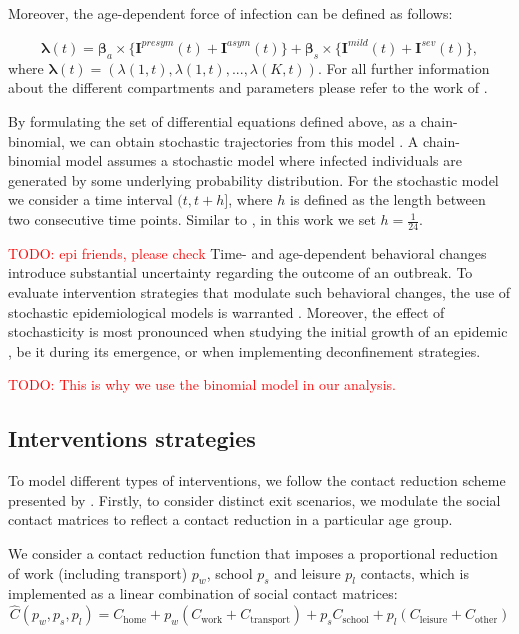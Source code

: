\documentclass{article}
\renewcommand{\cite}[1]{\citep{#1}}
\newcommand\todo[1]{\textcolor{red}{TODO: #1}}
\newcommand{\chome}{C_{\text{home}}}
\newcommand{\cwork}{C_{\text{work}}}
\newcommand{\ctransport}{C_{\text{transport}}}
\newcommand{\cschool}{C_{\text{school}}}
\newcommand{\cleisure}{C_{\text{leisure}}}
\newcommand{\cother}{C_{\text{other}}}
\newcommand{\agegroups}{K}
\begin{document}
Moreover, the age-dependent force of infection can be defined as follows:

\begin{equation}
    \boldsymbol{\lambda}(t) = \boldsymbol{\beta}_{a} \times \{ \textbf{I}^{presym}(t) + \textbf{I}^{asym}(t) \} +
    \boldsymbol{\beta}_{s} \times \{ \textbf{I}^{mild}(t) + \textbf{I}^{sev}(t) \},
\end{equation}
%
where $\boldsymbol{\lambda}(t) = (\lambda(1, t), \lambda(1, t), ..., \lambda(\agegroups, t))$. For all further information about the different compartments and parameters please refer to the work of \citet{abrams2021modelling}.

By formulating the set of differential equations defined above, as a chain-binomial, we can obtain stochastic trajectories from this model \cite{bailey1975mathematical}. A chain-binomial model assumes a stochastic model where infected individuals are generated by some underlying probability distribution. For the stochastic model we consider a time interval $(t, t +h]$, where $h$ is defined as the length between two consecutive time points. Similar to \citet{abrams2021modelling}, in this work we set $h = \frac{1}{24}$.

\todo{epi friends, please check} Time- and age-dependent behavioral changes introduce substantial uncertainty regarding the outcome of an outbreak. To evaluate intervention strategies that modulate such behavioral changes, the use of stochastic epidemiological models is warranted \cite{abrams2021modelling}. Moreover, the effect of stochasticity is most pronounced when studying the initial growth of an epidemic \cite{britton2009epidemic}, be it during its emergence, or when implementing deconfinement strategies.

\todo{This is why we use the binomial model in our analysis.}

\subsection{Interventions strategies}
\label{sec:interventions}
To model different types of interventions, we follow the contact reduction scheme presented by \citet{abrams2021modelling}. Firstly, to consider distinct exit scenarios, we modulate the social contact matrices to reflect a contact reduction in a particular age group.

We consider a contact reduction function that imposes a proportional reduction of work (including transport) $p_w$, school $p_s$ and leisure $p_l$ contacts, which is implemented as a linear combination of social contact matrices:
\begin{equation}
\label{eq:scm}
    \hat{C}(p_w, p_s, p_l) = \chome + p_w (\cwork + \ctransport) + p_s \cschool + p_l (\cleisure + \cother)
\end{equation}
\end{document}
